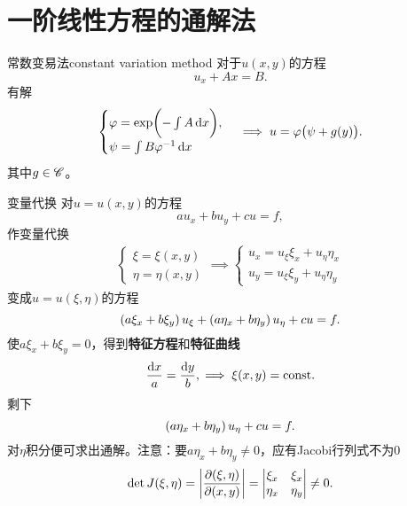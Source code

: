 \section{一阶线性方程的通解法}
\begin{method}{常数变易法}{constant variation method}
	对于$u(x,y)$的方程
	\[
		u_x+Ax=B.
	\]
	有解
	\begin{align*}
		\begin{cases}
			\varphi=\exp\biggl(-\int A\mathop{}\!\mathrm{d} x\biggr),  \\
			\psi=\int B\varphi^{-1}\mathop{}\!\mathrm{d} x
		\end{cases}
		\implies u=\varphi\bigl(\psi+g(y)\bigr).
	\end{align*}
	其中$g\in\mathscr C$。
\end{method}
\begin{method}{变量代换}
	对$u=u(x,y)$的方程
	\[
		au_x+bu_y+cu=f,
	\]
	作变量代换
	\begin{align*}
		\begin{cases}
			\xi=\xi(x,y)  \\
			\eta=\eta(x,y)
		\end{cases}
		\implies
		\begin{cases}
			u_x=u_\xi\xi_x+u_\eta\eta_x \\
			u_y=u_\xi\xi_y+u_\eta\eta_y
		\end{cases}
	\end{align*}
	变成$u=u(\xi,\eta)$的方程
	\[
		\left(a\xi_x+b\xi_y\right)u_\xi+\left(a\eta_x+b\eta_y\right)u_\eta+cu=f.
	\]
	使$a\xi_x+b\xi_y=0$，得到\textbf{特征方程}和\textbf{特征曲线}
	\begin{align}
		\frac{\mathop{}\!\mathrm{d} x}a=\frac{\mathop{}\!\mathrm{d} y}b,\implies\xi(x,y)=\mathrm{const}.
	\end{align}
	剩下
	\[
		\left(a\eta_x+b\eta_y\right)u_\eta+cu=f.
	\]
	对$\eta$积分便可求出通解。注意：要$a\eta_x+b\eta_y\neq 0$，应有Jacobi行列式不为0
	\begin{align*}
		\det J(\xi,\eta)=\left\lvert\frac{\partial(\xi,\eta)}{\partial(x,y)}\right\rvert=
		\begin{vmatrix}
			\xi_x  & \xi_x  \\
			\eta_x & \eta_y
		\end{vmatrix}\neq 0.
	\end{align*}
\end{method}
